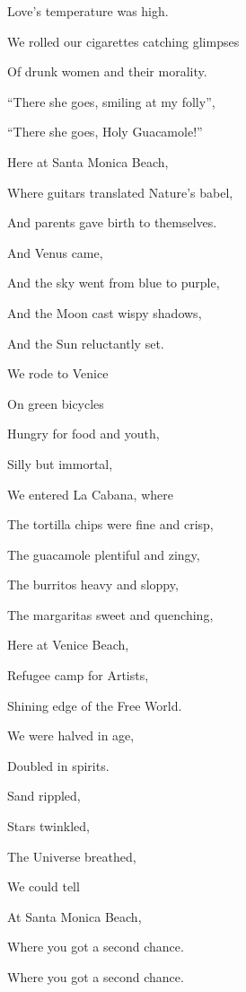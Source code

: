\documentclass{article}
\begin{document}
Love's temperature was high.

We rolled our cigarettes catching glimpses 

Of drunk women and their morality.

``There she goes, smiling at my folly'',

``There she goes, Holy Guacamole!''

Here at Santa Monica Beach,

Where guitars translated Nature's babel,

And parents gave birth to themselves.

\newline \newline

And Venus came,

And the sky went from blue to purple,

And the Moon cast wispy shadows,

And the Sun reluctantly set.

We rode to Venice

On green bicycles

Hungry for food and youth,

Silly but immortal,

We entered La Cabana, where

The tortilla chips were fine and crisp,

The guacamole plentiful and zingy,

The burritos heavy and sloppy,

The margaritas sweet and quenching,

Here at Venice Beach,

Refugee camp for Artists,

Shining edge of the Free World.

\newline \newline

We were halved in age,

Doubled in spirits.

Sand rippled,

Stars twinkled,

The Universe breathed,

We could tell

At Santa Monica Beach,

Where you got a second chance.

Where you got a second chance.
\end{document}
